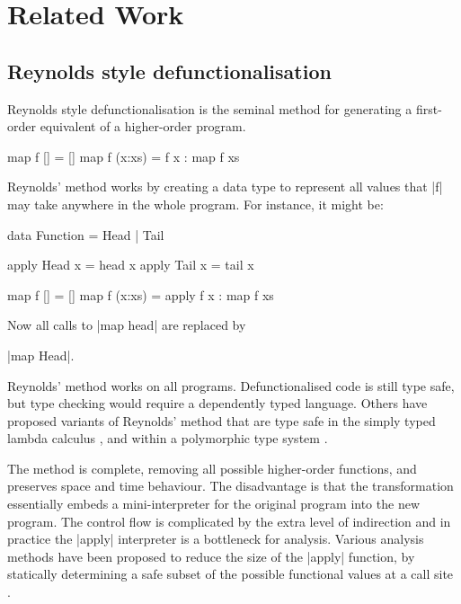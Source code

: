 \section{Related Work}
\label{secF:related}

\subsection{Reynolds style defunctionalisation}

Reynolds style defunctionalisation \cite{reynolds:defunc} is the seminal method for generating a first-order equivalent of a higher-order program.

\begin{example}
\begin{code}
map f []     = []
map f (x:xs) = f x : map f xs
\end{code}

\noindent Reynolds' method works by creating a data type to represent all values that |f| may take anywhere in the whole program. For instance, it might be:

\ignore\begin{code}
data Function = Head | Tail

apply Head  x = head  x
apply Tail  x = tail  x

map f []     = []
map f (x:xs) = apply f x : map f xs
\end{code}

\noindent Now all calls to |map head| are replaced by \ignore|map Head|.
\end{example}

Reynolds' method works on all programs. Defunctionalised code is still type safe, but type checking would require a dependently typed language. Others have proposed variants of Reynolds' method that are type safe in the simply typed lambda calculus \cite{bell:type_driven_defunctionalization}, and within a polymorphic type system \cite{pottier:polymorhpic_typed_defunctionaization}.

The method is complete, removing all possible higher-order functions, and preserves space and time behaviour. The disadvantage is that the transformation essentially embeds a mini-interpreter for the original program into the new program. The control flow is complicated by the extra level of indirection and in practice the |apply| interpreter is a bottleneck for analysis. Various analysis methods have been proposed to reduce the size of the |apply| function, by statically determining a safe subset of the possible functional values at a call site \cite{cejtin:closure_conversion,grin}.

